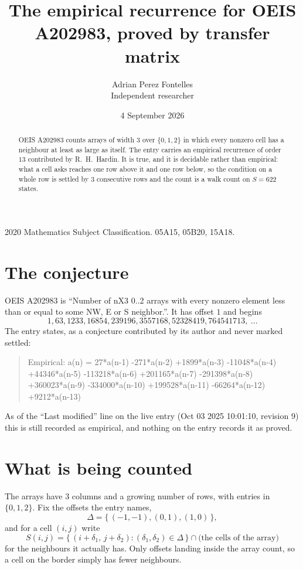 \documentclass[11pt,a4paper]{article}
\title{The empirical recurrence for OEIS A202983, proved by transfer matrix}
\author{Adrian Perez Fontelles\\ \small Independent researcher}
\date{4 September 2026}
\theoremstyle{plain}
\theoremstyle{definition}
\begin{document}
\maketitle

\begin{abstract}
OEIS A202983 counts arrays of width $3$ over $\{0,1,2\}$ in which every nonzero cell has a neighbour at least as large as itself. The entry carries an
empirical recurrence of order $13$ contributed by R.~H.~Hardin. It is true, and it is
decidable rather than empirical: what a cell asks reaches one row above it and one row below, so the
condition on a whole row is settled by $3$ consecutive rows and the count is a walk
count on $S=622$ states.
\end{abstract}

\noindent\small 2020 Mathematics Subject Classification. 05A15, 05B20, 15A18.\normalsize

\section{The conjecture}

OEIS A202983 is ``Number of nX3 0..2 arrays with every nonzero element less than or equal to some NW, E or S neighbor.''. It has offset $1$ and begins
\[
1, 63, 1233, 16854, 239196, 3557168, 52328419, 764541713,\ \dots
\]
The entry states, as a conjecture contributed by its author and never marked settled:
\begin{quote}
Empirical: a(n) = 27*a(n-1) -271*a(n-2) +1899*a(n-3) -11048*a(n-4) +44346*a(n-5) -113218*a(n-6) +201165*a(n-7) -291398*a(n-8) +360023*a(n-9) -334000*a(n-10) +199528*a(n-11) -66264*a(n-12) +9212*a(n-13)
\end{quote}
As of the ``Last modified'' line on the live entry (Oct 03 2025 10:01:10, revision 9) this is still
recorded as empirical, and nothing on the entry records it as proved.

\section{What is being counted}

The arrays have $3$ columns and a growing number of rows, with entries in $\{0,1,2\}$. Fix the
offsets the entry names,
\[
\Delta=\{\,(-1,-1), (0,1), (1,0)\,\},
\]
and for a cell $(i,j)$ write
\[
S(i,j)=\{\,(i+\delta_1,\,j+\delta_2) : (\delta_1,\delta_2)\in\Delta\,\}\cap
\text{(the cells of the array)}
\]
for the neighbours it actually has. Only offsets landing inside the array count, so a cell on
the border simply has fewer neighbours.
\end{document}
